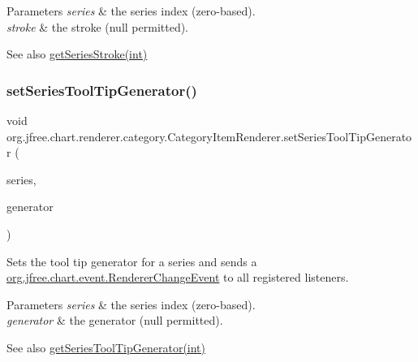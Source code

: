 \begin{DoxyParams}{Parameters}
{\em series} & the series index (zero-\/based). \\
\hline
{\em stroke} & the stroke ({\ttfamily null} permitted).\\
\hline
\end{DoxyParams}
\begin{DoxySeeAlso}{See also}
\mbox{\hyperlink{interfaceorg_1_1jfree_1_1chart_1_1renderer_1_1category_1_1_category_item_renderer_a4a3ff6564fafaf686b0cf73b564fabff}{get\+Series\+Stroke(int)}} 
\end{DoxySeeAlso}
\mbox{\label{interfaceorg_1_1jfree_1_1chart_1_1renderer_1_1category_1_1_category_item_renderer_a5015519bf531ff5a7f4e165c84f192cb}} 
\subsubsection{\texorpdfstring{set\+Series\+Tool\+Tip\+Generator()}{setSeriesToolTipGenerator()}}
{\footnotesize\ttfamily void org.\+jfree.\+chart.\+renderer.\+category.\+Category\+Item\+Renderer.\+set\+Series\+Tool\+Tip\+Generator (\begin{DoxyParamCaption}\item[{int}]{series,  }\item[{\mbox{\hyperlink{interfaceorg_1_1jfree_1_1chart_1_1labels_1_1_category_tool_tip_generator}{Category\+Tool\+Tip\+Generator}}}]{generator }\end{DoxyParamCaption})}

Sets the tool tip generator for a series and sends a \mbox{\hyperlink{classorg_1_1jfree_1_1chart_1_1event_1_1_renderer_change_event}{org.\+jfree.\+chart.\+event.\+Renderer\+Change\+Event}} to all registered listeners.


\begin{DoxyParams}{Parameters}
{\em series} & the series index (zero-\/based). \\
\hline
{\em generator} & the generator ({\ttfamily null} permitted).\\
\hline
\end{DoxyParams}
\begin{DoxySeeAlso}{See also}
\mbox{\hyperlink{interfaceorg_1_1jfree_1_1chart_1_1renderer_1_1category_1_1_category_item_renderer_a9266001456365d0bfa851db45a7c281f}{get\+Series\+Tool\+Tip\+Generator(int)}} 
\end{DoxySeeAlso}


